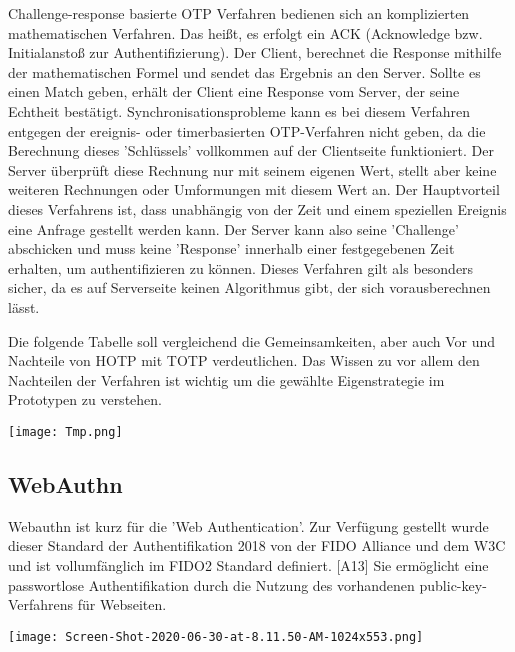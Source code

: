 Challenge-response basierte OTP Verfahren bedienen sich an komplizierten mathematischen Verfahren. Das heißt, es erfolgt ein ACK (Acknowledge bzw. Initialanstoß zur Authentifizierung). Der Client, berechnet die Response mithilfe der mathematischen Formel und sendet das Ergebnis an den Server. Sollte es einen Match geben, erhält der Client eine Response vom Server, der seine Echtheit bestätigt. Synchronisationsprobleme kann es bei diesem Verfahren entgegen der ereignis- oder timerbasierten OTP-Verfahren nicht geben, da die Berechnung dieses 'Schlüssels' vollkommen auf der Clientseite funktioniert. Der Server überprüft diese Rechnung nur mit seinem eigenen Wert, stellt aber keine weiteren Rechnungen oder Umformungen mit diesem Wert an. Der Hauptvorteil dieses Verfahrens ist, dass unabhängig von der Zeit und einem speziellen Ereignis eine Anfrage gestellt werden kann. Der Server kann also seine 'Challenge' abschicken und muss keine 'Response' innerhalb einer festgegebenen Zeit erhalten, um authentifizieren zu können. Dieses Verfahren gilt als besonders sicher, da es auf Serverseite keinen Algorithmus gibt, der sich vorausberechnen lässt.

Die folgende Tabelle soll vergleichend die Gemeinsamkeiten, aber auch Vor und Nachteile von HOTP mit TOTP verdeutlichen. Das Wissen zu vor allem den Nachteilen der Verfahren ist wichtig um die gewählte Eigenstrategie im Prototypen zu verstehen.

\texttt{[image: Tmp.png]}
\newpage

\subsection{WebAuthn}
Webauthn ist kurz für die 'Web Authentication'. Zur Verfügung gestellt wurde dieser Standard der Authentifikation 2018 von der FIDO Alliance und dem W3C und ist vollumfänglich im FIDO2 Standard definiert. [A13] Sie ermöglicht eine passwortlose Authentifikation durch die Nutzung des vorhandenen public-key-Verfahrens für Webseiten.

\texttt{[image: Screen-Shot-2020-06-30-at-8.11.50-AM-1024x553.png]}

